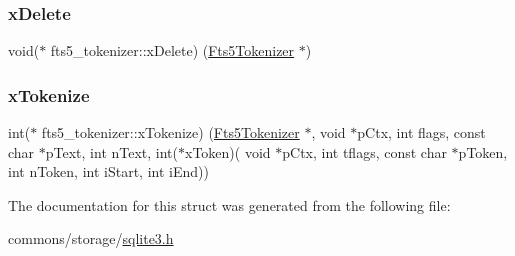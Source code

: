 \mbox{\label{structfts5__tokenizer_aaaa88b9f3e50f0b1120a05fb1bbb251f}} 
\subsubsection{\texorpdfstring{xDelete}{xDelete}}
{\footnotesize\ttfamily void($\ast$ fts5\+\_\+tokenizer\+::x\+Delete) (\mbox{\hyperlink{sqlite3_8h_ac015f88c5332d612a3125fc0014e468c}{Fts5\+Tokenizer}} $\ast$)}

\mbox{\label{structfts5__tokenizer_ae65ca5a9b1e6d5c1ef09731fccefa577}} 
\subsubsection{\texorpdfstring{xTokenize}{xTokenize}}
{\footnotesize\ttfamily int($\ast$ fts5\+\_\+tokenizer\+::x\+Tokenize) (\mbox{\hyperlink{sqlite3_8h_ac015f88c5332d612a3125fc0014e468c}{Fts5\+Tokenizer}} $\ast$, void $\ast$p\+Ctx, int flags, const char $\ast$p\+Text, int n\+Text, int($\ast$x\+Token)( void $\ast$p\+Ctx, int tflags, const char $\ast$p\+Token, int n\+Token, int i\+Start, int i\+End))}



The documentation for this struct was generated from the following file\+:\begin{DoxyCompactItemize}
\item 
commons/storage/\mbox{\hyperlink{sqlite3_8h}{sqlite3.\+h}}\end{DoxyCompactItemize}
